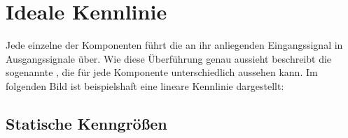 \documentclass[letterpaper,10pt,english]{jupyterBook}
\begin{document}
\sphinxstepscope


\section{Ideale Kennlinie}
\label{\detokenize{content/2_idealeKennlinie:ideale-kennlinie}}\label{\detokenize{content/2_idealeKennlinie::doc}}
\sphinxAtStartPar


\sphinxAtStartPar
Jede einzelne der Komponenten führt die an ihr anliegenden Eingangssignal in Ausgangssignale über. Wie diese Überführung genau aussieht beschreibt die sogenannte , die für jede Komponente unterschiedlich aussehen kann. Im folgenden Bild ist beispielshaft eine lineare Kennlinie dargestellt:

\sphinxAtStartPar
{}


\subsection{Statische Kenngrößen}
\label{\detokenize{content/2_idealeKennlinie:statische-kenngroszen}}
\sphinxAtStartPar
\end{document}
